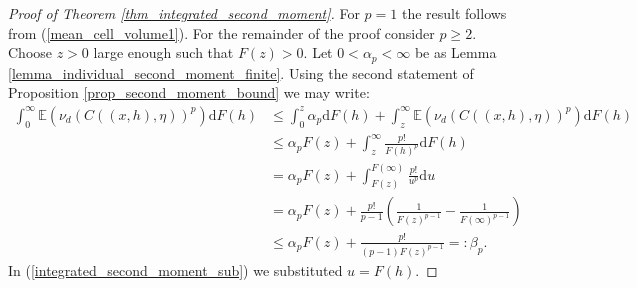 \documentclass{article}
\newcommand{\EE}{\mathbb{E}}
\theoremstyle{plain}
\theoremstyle{remark}
\theoremstyle{definition}
\begin{document}
\begin{proof}[Proof of Theorem \ref{thm_integrated_second_moment}]
    For $p=1$ the result follows from (\ref{mean_cell_volume1}). For the remainder of the proof consider $p \geq 2$. Choose $z > 0$ large enough such that $F(z) > 0$. Let $0 < \alpha_p < \infty$ be as Lemma \ref{lemma_individual_second_moment_finite}. Using the second statement of Proposition \ref{prop_second_moment_bound} we may write:
    {\allowdisplaybreaks
    \begin{align}
        \int_0^\infty \EE\left(\nu_d(C((x,h),\eta))^p\right) \mathrm{d}F(h) &\leq \int_0^z\alpha_p\mathrm{d}F(h) + \int_z^\infty\EE\left(\nu_d(C((x,h),\eta))^p\right)\mathrm{d}F(h) \nonumber \\
        &\leq \alpha_p F(z) + \int_z^\infty \frac{p!}{F(h)^p}\mathrm{d}F(h)\nonumber\\
        &= \alpha_pF(z) + \int_{F(z)}^{F(\infty)}\frac{p!}{u^p}\mathrm{d}u \label{integrated_second_moment_sub}\\
        &= \alpha_pF(z) + \frac{p!}{p-1}\left(\frac{1}{F(z)^{p-1}} - \frac{1}{F(\infty)^{p-1}} \right) \nonumber\\
        &\leq \alpha_pF(z) + \frac{p!}{(p-1)F(z)^{p-1}} =:\beta_p. \nonumber
    \end{align}}
    In (\ref{integrated_second_moment_sub}) we substituted $u = F(h)$.
\end{proof}
\end{document}
